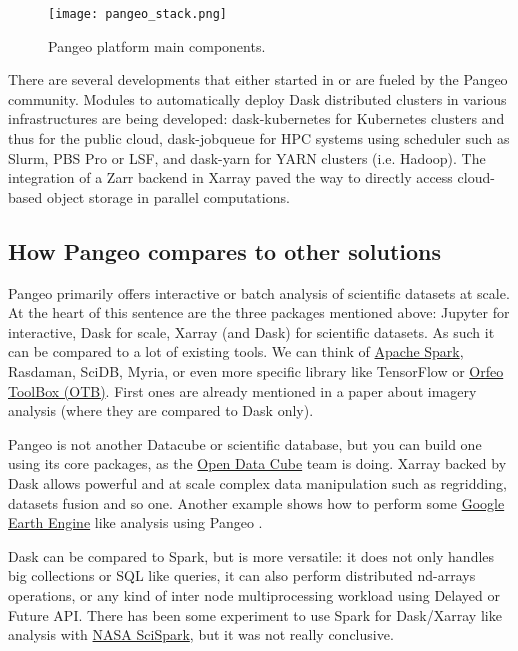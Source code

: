 \documentclass{article}
\begin{document}
\begin{figure}
  \centering
  \texttt{[image: pangeo\_stack.png]}
  \caption{\label{pangeo_stack} Pangeo platform main components.}
\end{figure}

There are several developments that either started in or are fueled by the
Pangeo community. Modules to automatically deploy Dask distributed clusters in various infrastructures are being developed: dask-kubernetes for Kubernetes clusters and thus for the public cloud, dask-jobqueue\cite{b4} for HPC systems using scheduler such as Slurm, PBS Pro or LSF, and dask-yarn for YARN clusters (i.e. Hadoop).
The integration of a Zarr backend in Xarray paved the way to directly access cloud-based object storage in parallel computations.


\subsection{How Pangeo compares to other solutions}
\label{ssec:pangeoadvantages}

Pangeo primarily offers interactive or batch analysis of scientific datasets at scale. 
At the heart of this sentence are the three packages mentioned above: 
Jupyter for interactive, Dask for scale, Xarray (and Dask) for scientific 
datasets.
As such it can be compared to a lot of existing tools. We can think of 
\href{https://spark.apache.org/}{Apache Spark}, Rasdaman, SciDB, Myria,
or even more specific library like TensorFlow or 
\href{https://www.orfeo-toolbox.org/}{Orfeo ToolBox (OTB)}. First ones are
already mentioned in a paper about imagery analysis \cite{b4_2} (where they
are compared to Dask only).

Pangeo is not another Datacube or scientific database, but you can
build one using its core packages, as the 
\href{https://www.opendatacube.org}{Open Data Cube} team is doing. Xarray
backed by Dask allows powerful and at scale complex data manipulation such as
regridding, datasets fusion and so one. Another example shows how to perform some 
\href{https://earthengine.google.com/}{Google Earth Engine} like
analysis using Pangeo \cite{b6}.

Dask can be compared to Spark, but is more versatile: it does not only
handles big collections or SQL like queries, it can also perform distributed
nd-arrays operations, or any kind of inter node multiprocessing workload using
Delayed or Future API. There has been some experiment to use Spark for Dask/Xarray like analysis with
\href{https://scispark.jpl.nasa.gov/}{NASA SciSpark}, but it was not really
conclusive.
\end{document}
